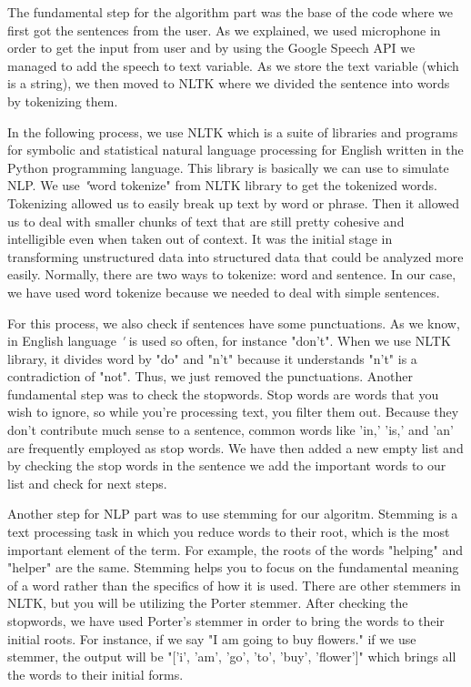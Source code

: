 \documentclass[twocolumn,10pt]{asme2ej}
\begin{document}
The fundamental step for the algorithm part was the base of the code where we first got the sentences from the user. As we explained, we used microphone in order to get the input from user and by using the Google Speech API we managed to add the speech to text variable. As we store the text variable (which is a string), we then moved to NLTK where we divided the sentence into words by tokenizing them. 

In the following process, we use NLTK which is a suite of libraries and programs for symbolic and statistical natural language processing for English written in the Python programming language. This library is basically we can use to simulate NLP. We use {\emph "word tokenize"} from NLTK library to get the tokenized words. Tokenizing allowed us to easily break up text by word or phrase. Then it allowed us to deal with smaller chunks of text that are still pretty cohesive and intelligible even when taken out of context. It was the initial stage in transforming unstructured data into structured data that could be analyzed more easily. Normally, there are two ways to tokenize: word and sentence. In our case, we have used word tokenize because we needed to deal with simple sentences. 

For this process, we also check if sentences have some punctuations. As we know, in English language {\emph '} is used so often, for instance "don't". When we use NLTK library, it divides word by "do" and "n't" because it understands "n't" is a contradiction of "not". Thus, we just removed the punctuations. Another fundamental step was to check the stopwords. Stop words are words that you wish to ignore, so while you're processing text, you filter them out. Because they don't contribute much sense to a sentence, common words like 'in,' 'is,' and 'an' are frequently employed as stop words. We have then added a new empty list and by checking the stop words in the sentence we add the important words to our list and check for next steps. 

Another step for NLP part was to use stemming for our algoritm. Stemming is a text processing task in which you reduce words to their root, which is the most important element of the term. For example, the roots of the words "helping" and "helper" are the same. Stemming helps you to focus on the fundamental meaning of a word rather than the specifics of how it is used. There are other stemmers in NLTK, but you will be utilizing the Porter stemmer. After checking the stopwords, we have used Porter's stemmer in order to bring the words to their initial roots. For instance, if we say "I am going to buy flowers." if we use stemmer, the output will be "['i', 'am', 'go', 'to', 'buy', 'flower']" which brings all the words to their initial forms. 
\end{document}
